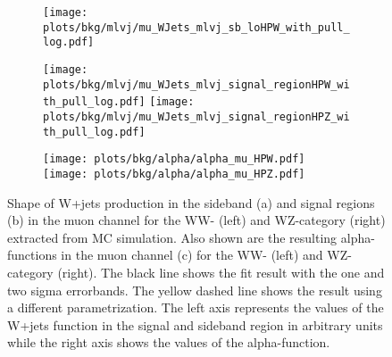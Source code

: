 \begin{figure}
	\centering
	\begin{subfigure}{\textwidth}
		\centering
		\texttt{[image: plots/bkg/mlvj/mu\_WJets\_mlvj\_sb\_loHPW\_with\_pull\_log.pdf]}		
		\caption{}		
	\end{subfigure}
	\begin{subfigure}{\textwidth}
		\texttt{[image: plots/bkg/mlvj/mu\_WJets\_mlvj\_signal\_regionHPW\_with\_pull\_log.pdf]}
		\texttt{[image: plots/bkg/mlvj/mu\_WJets\_mlvj\_signal\_regionHPZ\_with\_pull\_log.pdf]}	
		\caption{}
	\end{subfigure}
	\begin{subfigure}{\textwidth}	
		\texttt{[image: plots/bkg/alpha/alpha\_mu\_HPW.pdf]}
		\texttt{[image: plots/bkg/alpha/alpha\_mu\_HPZ.pdf]}
		\caption{}
	\end{subfigure}
	\caption[Shape of W+jets production in the sideband and signal regions as well as the resulting alpha-function]{Shape of W+jets production in the sideband (a) and signal regions (b) in the muon channel for the WW- (left) and WZ-category (right) extracted from MC simulation. Also shown are the resulting alpha-functions in the muon channel (c) for the WW- (left) and WZ-category (right). The black line shows the fit result with the one and two sigma errorbands. The yellow dashed line shows the result using a different parametrization. The left axis represents the values of the W+jets function in the signal and sideband region in arbitrary units while the right axis shows the values of the alpha-function.}
	\label{fig:bkg:mwvmc_alpha_mu}
\end{figure}	
	


